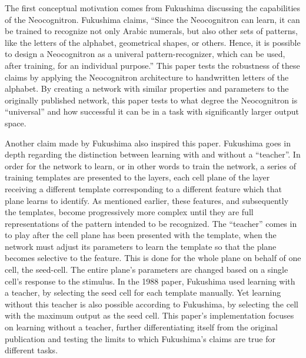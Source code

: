 \documentclass[12pt]{article}
\begin{document}
The first conceptual motivation comes from Fukushima discussing the capabilities of the Neocognitron. Fukushima claims, ``Since the Neocognitron can learn, it can be trained to recognize not only Arabic numerals, but also other sets of patterns, like the letters of the alphabet, geometrical shapes, or others. Hence, it is possible to design a Neocognitron as a univeral pattern-recognizer, which can be used, after training, for an individual purpose.'' This paper tests the robustness of these claims by applying the Neocognitron architecture to handwritten letters of the alphabet. By creating a network with similar properties and parameters to the originally published network, this paper tests to what degree the Neocognitron is ``universal'' and how successful it can be in a task with significantly larger output space.

Another claim made by Fukushima also inspired this paper. Fukushima goes in depth regarding the distinction between learning with and without a ``teacher''. In order for the network to learn, or in other words to train the network, a series of training templates are presented to the layers, each cell plane of the layer receiving a different template corresponding to a different feature which that plane learns to identify. As mentioned earlier, these features, and subsequently the templates, become progressively more complex until they are full representations of the pattern intended to be recognized. The ``teacher'' comes in to play after the cell plane has been presented with the template, when the network must adjust its parameters to learn the template so that the plane becomes selective to the feature. This is done for the whole plane on behalf of one cell, the seed-cell. The entire plane's parameters are changed based on a single cell's response to the stimulus. In the 1988 paper, Fukushima used learning with a teacher, by selecting the seed cell for each template manually. Yet learning without this teacher is also possible according to Fukushima, by selecting the cell with the maximum output as the seed cell. This paper's implementation focuses on learning without a teacher, further differentiating itself from the original publication and testing the limits to which Fukushima's claims are true for different tasks. 
\end{document}
